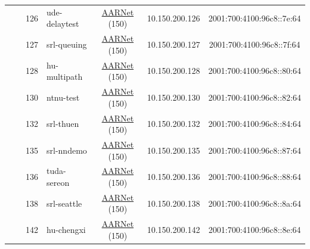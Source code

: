 \begin{small}
\begin{center}
\begin{longtable}{|c|c|c|c|c|c|c|c|}
  &  & \tiny{126} & \multicolumn{1}{|l|}{\tiny{ude-delaytest}} & \multicolumn{2}{|c|}{\tiny{\href{https://www.aarnet.edu.au/}{AARNet} (150)}} & \tiny{10.150.200.126} & \tiny{2001:700:4100:96c8::7e:64} \\* \cline{3-3}\cline{4-4}\cline{5-5}\cline{6-6}\cline{7-7}\cline{8-8}
  &  & \tiny{127} & \multicolumn{1}{|l|}{\tiny{srl-queuing}} & \multicolumn{2}{|c|}{\tiny{\href{https://www.aarnet.edu.au/}{AARNet} (150)}} & \tiny{10.150.200.127} & \tiny{2001:700:4100:96c8::7f:64} \\* \cline{3-3}\cline{4-4}\cline{5-5}\cline{6-6}\cline{7-7}\cline{8-8}
  &  & \tiny{128} & \multicolumn{1}{|l|}{\tiny{hu-multipath}} & \multicolumn{2}{|c|}{\tiny{\href{https://www.aarnet.edu.au/}{AARNet} (150)}} & \tiny{10.150.200.128} & \tiny{2001:700:4100:96c8::80:64} \\* \cline{3-3}\cline{4-4}\cline{5-5}\cline{6-6}\cline{7-7}\cline{8-8}
  &  & \tiny{130} & \multicolumn{1}{|l|}{\tiny{ntnu-test}} & \multicolumn{2}{|c|}{\tiny{\href{https://www.aarnet.edu.au/}{AARNet} (150)}} & \tiny{10.150.200.130} & \tiny{2001:700:4100:96c8::82:64} \\* \cline{3-3}\cline{4-4}\cline{5-5}\cline{6-6}\cline{7-7}\cline{8-8}
  &  & \tiny{132} & \multicolumn{1}{|l|}{\tiny{srl-thuen}} & \multicolumn{2}{|c|}{\tiny{\href{https://www.aarnet.edu.au/}{AARNet} (150)}} & \tiny{10.150.200.132} & \tiny{2001:700:4100:96c8::84:64} \\* \cline{3-3}\cline{4-4}\cline{5-5}\cline{6-6}\cline{7-7}\cline{8-8}
  &  & \tiny{135} & \multicolumn{1}{|l|}{\tiny{srl-nndemo}} & \multicolumn{2}{|c|}{\tiny{\href{https://www.aarnet.edu.au/}{AARNet} (150)}} & \tiny{10.150.200.135} & \tiny{2001:700:4100:96c8::87:64} \\* \cline{3-3}\cline{4-4}\cline{5-5}\cline{6-6}\cline{7-7}\cline{8-8}
  &  & \tiny{136} & \multicolumn{1}{|l|}{\tiny{tuda-sereon}} & \multicolumn{2}{|c|}{\tiny{\href{https://www.aarnet.edu.au/}{AARNet} (150)}} & \tiny{10.150.200.136} & \tiny{2001:700:4100:96c8::88:64} \\* \cline{3-3}\cline{4-4}\cline{5-5}\cline{6-6}\cline{7-7}\cline{8-8}
  &  & \tiny{138} & \multicolumn{1}{|l|}{\tiny{srl-seattle}} & \multicolumn{2}{|c|}{\tiny{\href{https://www.aarnet.edu.au/}{AARNet} (150)}} & \tiny{10.150.200.138} & \tiny{2001:700:4100:96c8::8a:64} \\* \cline{3-3}\cline{4-4}\cline{5-5}\cline{6-6}\cline{7-7}\cline{8-8}
  &  & \tiny{142} & \multicolumn{1}{|l|}{\tiny{hu-chengxi}} & \multicolumn{2}{|c|}{\tiny{\href{https://www.aarnet.edu.au/}{AARNet} (150)}} & \tiny{10.150.200.142} & \tiny{2001:700:4100:96c8::8e:64} \\* \cline{3-3}\cline{4-4}\cline{5-5}\cline{6-6}\cline{7-7}\cline{8-8}

\end{longtable}
\end{center}
\end{small}
